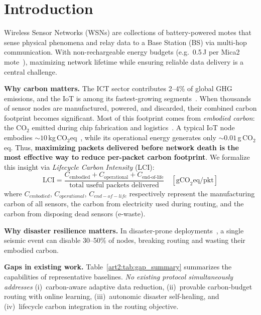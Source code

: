 \section{Introduction}
\label{art2:sec:introduction}

Wireless Sensor Networks (WSNs) are collections of battery-powered motes that sense physical phenomena and relay data to a Base Station (BS) via multi-hop communication.
With non-rechargeable energy budgets (e.g.\ 0.5\,J per Mica2 mote~\cite{heinzelman2002leach}), maximizing network lifetime while ensuring reliable data delivery is a central challenge.

\textbf{Why carbon matters.} The ICT sector contributes 2--4\% of global GHG emissions, and the IoT is among its fastest-growing segments~\cite{freitag2021ict, huynh2025carbon_dt}. When thousands of sensor nodes are manufactured, powered, and discarded, their combined carbon footprint becomes significant. Most of this footprint comes from \emph{embodied carbon}: the CO$_2$ emitted during chip fabrication and logistics~\cite{pirson2021embodied}. A typical IoT node embodies ${\sim}10$\,kg\,CO$_2$eq~\cite{pirson2021embodied}, while its operational energy generates only ${\sim}0.01$\,g\,CO$_2$eq. Thus, \textbf{maximizing packets delivered before network death is the most effective way to reduce per-packet carbon footprint}. We formalize this insight via \emph{Lifecycle Carbon Intensity} (LCI):
\begin{equation}
    \text{LCI} = \frac{C_{\text{embodied}} + C_{\text{operational}} + C_{\text{end-of-life}}}{\text{total useful packets delivered}} \quad [\text{gCO}_2\text{eq/pkt}]
    \label{art2:eq:lci}
\end{equation}
where $C_{embodied}$, $C_{operational}$, $C_{end-of-life}$ respectively represent the manufacturing carbon of all sensors, the carbon from electricity used during routing, and the carbon from disposing dead sensors (e-waste).

\textbf{Why disaster resilience matters.}
In disaster-prone deployments~\cite{erdelj2017disaster, karaman2025disaster_survey}, a single seismic event can disable 30--50\% of nodes, breaking routing and wasting their embodied carbon.

\textbf{Gaps in existing work.}
Table~\ref{art2:tab:gap_summary} summarizes the capabilities of representative baselines.
\emph{No existing protocol simultaneously addresses} (i)~carbon-aware adaptive data reduction, (ii)~provable carbon-budget routing with online learning, (iii)~autonomic disaster self-healing, and (iv)~lifecycle carbon integration in the routing objective.


